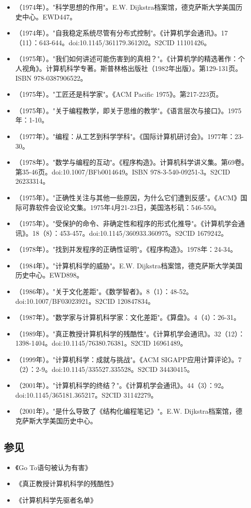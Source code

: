 \begin{itemize}
\item （1974年）。"科学思想的作用"。E.W. Dijkstra档案馆，德克萨斯大学美国历史中心。EWD447。
\item （1974年）。"自我稳定系统尽管有分布式控制"。《计算机学会通讯》。17（11）：643-644。doi:10.1145/361179.361202。S2CID 11101426。
\item （1975年）。"我们如何讲述可能伤害到的真相？"。《计算机学的精选著作：个人视角》。计算机科学专著。斯普林格出版社（1982年出版）。第129-131页。ISBN 978-0387906522。
\item （1975年）。"工匠还是科学家"。《ACM Pacific 1975》。第217-223页。
\item （1975年）。"关于编程教学，即关于思维的教学"。《语言层次与接口》。1975年：1-10。
\item （1977年）。"编程：从工艺到科学学科"。《国际计算机研讨会》。1977年：23-30。
\item （1978年）。"数学与编程的互动"。《程序构造》。计算机科学讲义集。第69卷。第35-46页。doi:10.1007/BFb0014649。ISBN 978-3-540-09251-3。S2CID 26233314。
\item （1975年）。"正确性关注与其他一些原因，为什么它们遭到反感"。《ACM》国际可靠软件会议论文集。1975年4月21-23日，美国洛杉矶：546-550。
\item （1975年）。"受保护的命令、非确定性和程序的形式化推导"。《计算机学会通讯》。18（8）：453-457。doi:10.1145/360933.360975。S2CID 1679242。
\item （1978年）。"找到并发程序的正确性证明"。《程序构造》。1978年：24-34。
\item （1984年）。"计算机科学的威胁"。E.W. Dijkstra档案馆，德克萨斯大学美国历史中心。EWD898。
\item （1986年）。"关于文化差距"。《数学智者》。8（1）：48-52。doi:10.1007/BF03023921。S2CID 120847834。
\item （1987年）。"数学家与计算机科学家：文化差距"。《算盘》。4（4）：26-31。
\item （1989年）。"真正教授计算机科学的残酷性"。《计算机学会通讯》。32（12）：1398-1404。doi:10.1145/76380.76381。S2CID 16961489。
\item （1999年）。"计算机科学：成就与挑战"。《ACM SIGAPP应用计算评论》。7（2）：2-9。doi:10.1145/335527.335528。S2CID 34430415。
\item （2001年）。"计算机科学的终结？"。《计算机学会通讯》。44（3）：92。doi:10.1145/365181.365217。S2CID 31142279。
\item （2001年）。"是什么导致了《结构化编程笔记》"。E.W. Dijkstra档案馆，德克萨斯大学美国历史中心。
\end{itemize}
\subsection{参见}
\begin{itemize}
\item 《Go To语句被认为有害》
\item 《真正教授计算机科学的残酷性》
\item 《计算机科学先驱者名单》
\end{itemize}